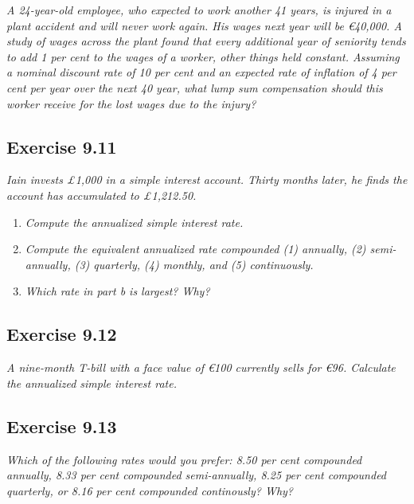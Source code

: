 \documentclass[]{book}
\newcommand{\euro}{€}
\theoremstyle{definition}
\theoremstyle{definition}
\theoremstyle{remark}
\begin{document}
\emph{A 24-year-old employee, who expected to work another 41 years, is
injured in a plant accident and will never work again. His wages next
year will be \euro{}40,000. A study of wages across the plant found that
every additional year of seniority tends to add 1 per cent to the wages
of a worker, other things held constant. Assuming a nominal discount
rate of 10 per cent and an expected rate of inflation of 4 per cent per
year over the next 40 year, what lump sum compensation should this
worker receive for the lost wages due to the injury?}
\citep[p.307]{book}

\subsection{Exercise 9.11}\label{exercise-9.11}

\emph{Iain invests £1,000 in a simple interest account. Thirty months
later, he finds the account has accumulated to £1,212.50.}
\citep[p.307]{book}

\begin{enumerate}
\def\labelenumi{\alph{enumi}.}
\item
  \emph{Compute the annualized simple interest rate.}
  \citep[p.307]{book}
\item
  \emph{Compute the equivalent annualized rate compounded (1) annually,
  (2) semi-annually, (3) quarterly, (4) monthly, and (5) continuously.}
  \citep[p.307]{book}
\item
  \emph{Which rate in part b is largest? Why?} \citep[p.307]{book}
\end{enumerate}

\subsection{Exercise 9.12}\label{exercise-9.12}

\emph{A nine-month T-bill with a face value of \euro{}100 currently
sells for \euro{}96. Calculate the annualized simple interest rate.}
\citep[p.307]{book}

\subsection{Exercise 9.13}\label{exercise-9.13}

\emph{Which of the following rates would you prefer: 8.50 per cent
compounded annually, 8.33 per cent compounded semi-annually, 8.25 per
cent compounded quarterly, or 8.16 per cent compounded continously?
Why?} \citep[p.307]{book}
\end{document}
